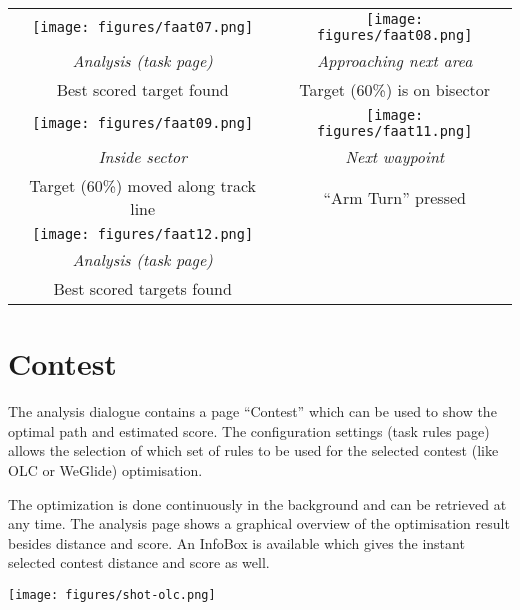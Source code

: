 \begin{maxipage}
\begin{center}
\begin{longtable}{|c|c|}
\toprule
\texttt{[image: figures/faat07.png]} & 
\texttt{[image: figures/faat08.png]} \\
\emph{Analysis (task page)} & \emph{Approaching next area} \\
Best scored target found & Target (60\%) is on bisector \\

\midrule
\texttt{[image: figures/faat09.png]} & 
\texttt{[image: figures/faat11.png]} \\
\emph{Inside sector} & \emph{Next waypoint} \\
Target (60\%) moved along track line & ``Arm Turn'' pressed \\

\midrule
\texttt{[image: figures/faat12.png]} &  \\
\emph{Analysis (task page)} &  \\
Best scored targets found &  \\

\bottomrule
\end{longtable}
\end{center}
\end{maxipage}

\section{Contest}

The analysis dialogue contains a page ``Contest'' which can be
used to show the optimal path and estimated score.  The configuration settings  
(task rules page) allows the selection of which set of rules to be used for the selected
contest (like OLC or WeGlide) optimisation.

The optimization is done continuously in the background and can be retrieved at
any time. The analysis page shows a graphical overview of the optimisation
result besides distance and score. An InfoBox is available which gives the
instant selected contest distance and score as well.

\begin{center}
\texttt{[image: figures/shot-olc.png]}
\end{center}

